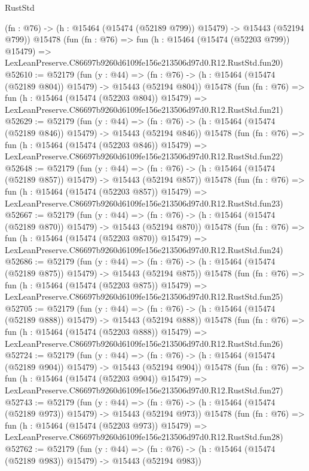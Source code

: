\begin{lexlean}{RustStd}
\begin{coremodule}
    (fn : @76) -> (h : @15464 (@15474 (@52189 @799)) @15479) -> @15443 (@52194 @799))
    @15478
    (fun (fn : @76) =>
    fun (h : @15464 (@15474 (@52203 @799)) @15479) =>
    LexLeanPreserve.C86697b9260d6109fe156e213506d97d0.R12.RustStd.fun20)
@52610 := @52179
    (fun (y : @44) =>
    (fn : @76) -> (h : @15464 (@15474 (@52189 @804)) @15479) -> @15443 (@52194 @804))
    @15478
    (fun (fn : @76) =>
    fun (h : @15464 (@15474 (@52203 @804)) @15479) =>
    LexLeanPreserve.C86697b9260d6109fe156e213506d97d0.R12.RustStd.fun21)
@52629 := @52179
    (fun (y : @44) =>
    (fn : @76) -> (h : @15464 (@15474 (@52189 @846)) @15479) -> @15443 (@52194 @846))
    @15478
    (fun (fn : @76) =>
    fun (h : @15464 (@15474 (@52203 @846)) @15479) =>
    LexLeanPreserve.C86697b9260d6109fe156e213506d97d0.R12.RustStd.fun22)
@52648 := @52179
    (fun (y : @44) =>
    (fn : @76) -> (h : @15464 (@15474 (@52189 @857)) @15479) -> @15443 (@52194 @857))
    @15478
    (fun (fn : @76) =>
    fun (h : @15464 (@15474 (@52203 @857)) @15479) =>
    LexLeanPreserve.C86697b9260d6109fe156e213506d97d0.R12.RustStd.fun23)
@52667 := @52179
    (fun (y : @44) =>
    (fn : @76) -> (h : @15464 (@15474 (@52189 @870)) @15479) -> @15443 (@52194 @870))
    @15478
    (fun (fn : @76) =>
    fun (h : @15464 (@15474 (@52203 @870)) @15479) =>
    LexLeanPreserve.C86697b9260d6109fe156e213506d97d0.R12.RustStd.fun24)
@52686 := @52179
    (fun (y : @44) =>
    (fn : @76) -> (h : @15464 (@15474 (@52189 @875)) @15479) -> @15443 (@52194 @875))
    @15478
    (fun (fn : @76) =>
    fun (h : @15464 (@15474 (@52203 @875)) @15479) =>
    LexLeanPreserve.C86697b9260d6109fe156e213506d97d0.R12.RustStd.fun25)
@52705 := @52179
    (fun (y : @44) =>
    (fn : @76) -> (h : @15464 (@15474 (@52189 @888)) @15479) -> @15443 (@52194 @888))
    @15478
    (fun (fn : @76) =>
    fun (h : @15464 (@15474 (@52203 @888)) @15479) =>
    LexLeanPreserve.C86697b9260d6109fe156e213506d97d0.R12.RustStd.fun26)
@52724 := @52179
    (fun (y : @44) =>
    (fn : @76) -> (h : @15464 (@15474 (@52189 @904)) @15479) -> @15443 (@52194 @904))
    @15478
    (fun (fn : @76) =>
    fun (h : @15464 (@15474 (@52203 @904)) @15479) =>
    LexLeanPreserve.C86697b9260d6109fe156e213506d97d0.R12.RustStd.fun27)
@52743 := @52179
    (fun (y : @44) =>
    (fn : @76) -> (h : @15464 (@15474 (@52189 @973)) @15479) -> @15443 (@52194 @973))
    @15478
    (fun (fn : @76) =>
    fun (h : @15464 (@15474 (@52203 @973)) @15479) =>
    LexLeanPreserve.C86697b9260d6109fe156e213506d97d0.R12.RustStd.fun28)
@52762 := @52179
    (fun (y : @44) =>
    (fn : @76) -> (h : @15464 (@15474 (@52189 @983)) @15479) -> @15443 (@52194 @983))

\end{coremodule}
\end{lexlean}
